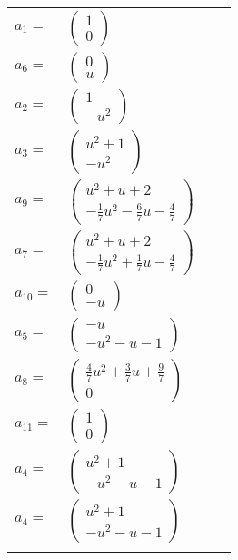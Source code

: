 \documentclass[1p]{elsarticle_modified}
\theoremstyle{definition}
\begin{document}
\begin{tabular}{m{7pt} m{180pt} m{7pt} m{180pt} }
\flushright $a_{1}=$&$\begin{pmatrix}1\\0\end{pmatrix}$ \\
\flushright $a_{6}=$&$\begin{pmatrix}0\\u\end{pmatrix}$ \\
\flushright $a_{2}=$&$\begin{pmatrix}1\\- u^2\end{pmatrix}$ \\
\flushright $a_{3}=$&$\begin{pmatrix}u^2+1\\- u^2\end{pmatrix}$ \\
\flushright $a_{9}=$&$\begin{pmatrix}u^2+u+2\\-\frac{1}{7} u^2-\frac{6}{7} u-\frac{4}{7}\end{pmatrix}$ \\
\flushright $a_{7}=$&$\begin{pmatrix}u^2+u+2\\-\frac{1}{7} u^2+\frac{1}{7} u-\frac{4}{7}\end{pmatrix}$ \\
\flushright $a_{10}=$&$\begin{pmatrix}0\\- u\end{pmatrix}$ \\
\flushright $a_{5}=$&$\begin{pmatrix}- u\\- u^2- u-1\end{pmatrix}$ \\
\flushright $a_{8}=$&$\begin{pmatrix}\frac{4}{7} u^2+\frac{3}{7} u+\frac{9}{7}\\0\end{pmatrix}$ \\
\flushright $a_{11}=$&$\begin{pmatrix}1\\0\end{pmatrix}$ \\
\flushright $a_{4}=$&$\begin{pmatrix}u^2+1\\- u^2- u-1\end{pmatrix}$\\ \flushright $a_{4}=$&$\begin{pmatrix}u^2+1\\- u^2- u-1\end{pmatrix}$\\&\end{tabular}
\end{document}
